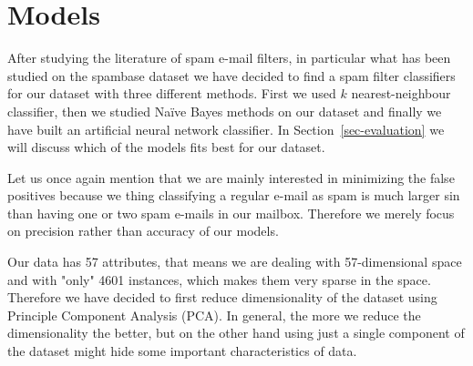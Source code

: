 \documentclass[11pt,a4paper]{article}
\begin{document}
\section{Models}
\label{sec-models}

After studying the literature of spam e-mail filters, in particular what has been studied on the spambase dataset we have decided to find a spam filter classifiers for our dataset with three different methods. First we used $k$ nearest-neighbour classifier, then we studied Na\"ive Bayes methods on our dataset and finally we have built an artificial neural network classifier. In Section~\ref{sec-evaluation} we will discuss which of the models fits best for our dataset.

Let us once again mention that we are mainly interested in minimizing the false positives because we thing classifying a regular e-mail as spam is much larger sin than having one or two spam e-mails in our mailbox. Therefore we merely focus on precision rather than accuracy of our models.

\bigskip

\noindent
{}

\smallskip

Our data has 57 attributes, that means we are dealing with 57-dimensional space and with "only" 4601 instances, which makes them very sparse in the space. Therefore we have decided to first reduce dimensionality of the dataset using Principle Component Analysis (PCA). In general, the more we reduce the dimensionality the better, but on the other hand using just a single component of the dataset might hide some important characteristics of data. 
\end{document}
